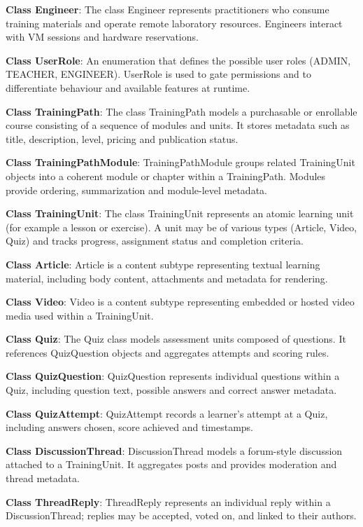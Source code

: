 \textbf{Class Engineer}: The class Engineer represents practitioners who consume
training materials and operate remote laboratory resources. Engineers interact
with VM sessions and hardware reservations.

\textbf{Class UserRole}: An enumeration that defines the possible user roles
(ADMIN, TEACHER, ENGINEER). UserRole is used to gate permissions and to
differentiate behaviour and available features at runtime.

\textbf{Class TrainingPath}: The class TrainingPath models a purchasable or
enrollable course consisting of a sequence of modules and units. It stores
metadata such as title, description, level, pricing and publication status.

\textbf{Class TrainingPathModule}: TrainingPathModule groups related
TrainingUnit objects into a coherent module or chapter within a TrainingPath.
Modules provide ordering, summarization and module-level metadata.

\textbf{Class TrainingUnit}: The class TrainingUnit represents an atomic
learning unit (for example a lesson or exercise). A unit may be of various
types (Article, Video, Quiz) and tracks progress, assignment status and
completion criteria.

\textbf{Class Article}: Article is a content subtype representing textual
learning material, including body content, attachments and metadata for
rendering.

\textbf{Class Video}: Video is a content subtype representing embedded or
hosted video media used within a TrainingUnit.

\textbf{Class Quiz}: The Quiz class models assessment units composed of
questions. It references QuizQuestion objects and aggregates attempts and
scoring rules.

\textbf{Class QuizQuestion}: QuizQuestion represents individual questions
within a Quiz, including question text, possible answers and correct answer
metadata.

\textbf{Class QuizAttempt}: QuizAttempt records a learner's attempt at a Quiz,
including answers chosen, score achieved and timestamps.

\textbf{Class DiscussionThread}: DiscussionThread models a forum-style
discussion attached to a TrainingUnit. It aggregates posts and provides
moderation and thread metadata.

\textbf{Class ThreadReply}: ThreadReply represents an individual reply within
a DiscussionThread; replies may be accepted, voted on, and linked to their
authors.

